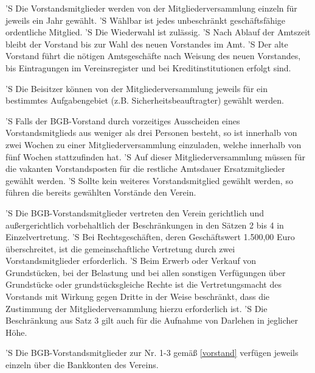 \documentclass[a4paper,10pt]{scrreprt}
\begin{document}
\begin{contract}
'S Die Vorstandsmitglieder werden von der Mitgliederversammlung einzeln für
jeweils ein Jahr gewählt.
'S Wählbar ist jedes unbeschränkt geschäftsfähige ordentliche Mitglied.
'S Die Wiederwahl ist zulässig.
'S Nach Ablauf der Amtszeit bleibt der Vorstand bis zur Wahl des
neuen Vorstandes im Amt.
'S Der alte Vorstand führt die nötigen Amtsgeschäfte nach Weisung des neuen
Vorstandes, bis Eintragungen im Vereinsregister und bei Kreditinstitutionen
erfolgt sind.

'S Die Beisitzer können von der Mitgliederversammlung jeweils für ein
bestimmtes Aufgabengebiet (z.B. Sicherheitsbeauftragter) gewählt werden.

'S Falls der BGB-Vorstand durch vorzeitiges Ausscheiden eines Vorstandsmitglieds
aus weniger als drei Personen besteht, so ist innerhalb von zwei Wochen zu
einer Mitgliederversammlung einzuladen, welche innerhalb von fünf Wochen
stattzufinden hat.
'S Auf dieser Mitgliederversammlung müssen für die vakanten Vorstandsposten für
die restliche Amtsdauer Ersatzmitglieder gewählt werden.
'S Sollte kein weiteres Vorstandsmitglied gewählt werden, so führen die bereits
gewählten Vorstände den Verein.

'S Die BGB-Vorstandsmitglieder vertreten den Verein gerichtlich und
außergerichtlich vorbehaltlich der Beschränkungen in den Sätzen 2 bis 4 in
Einzelvertretung.
'S Bei Rechtsgeschäften, deren Geschäftswert 1.500,00 Euro überschreitet, ist
die gemeinschaftliche Vertretung durch zwei Vorstandsmitglieder erforderlich.
'S Beim Erwerb oder Verkauf von Grundstücken, bei der Belastung und bei allen
sonstigen Verfügungen über Grundstücke oder grundstücksgleiche Rechte ist die
Vertretungsmacht des Vorstands mit Wirkung gegen Dritte in der Weise
beschränkt, dass die Zustimmung der Mitgliederversammlung hierzu erforderlich
ist.
'S Die Beschränkung aus Satz 3 gilt auch für die Aufnahme von Darlehen in
jeglicher Höhe.

'S Die BGB-Vorstandsmitglieder zur Nr. 1-3 gemäß \ref{vorstand} verfügen
jeweils einzeln über die Bankkonten des Vereins.


\end{contract}
\end{document}

